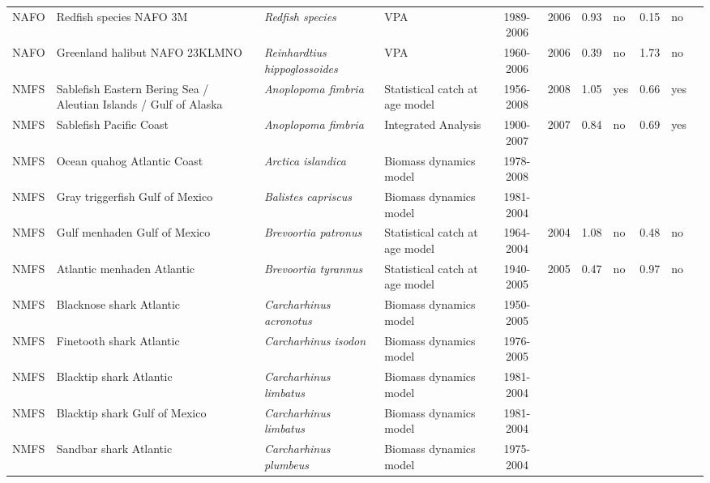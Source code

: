 \begin{longtable}{p{1.8cm}p{3.5cm}p{3.5cm}p{3cm}cccp{0.9cm}cp{0.9cm}c}
  NAFO & Redfish species NAFO 3M & \textit{Redfish species} & VPA & 1989-2006 & 2006 & 0.93 & no & 0.15 & no & \cite{NAFO-RED3M-2007.pdf} \\ 
  NAFO & Greenland halibut NAFO 23KLMNO & \textit{Reinhardtius hippoglossoides} & VPA & 1960-2006 & 2006 & 0.39 & no & 1.73 & no & \cite{NAFO-GHAL23KLMNO-2007.pdf} \\ 
  NMFS & Sablefish Eastern Bering Sea / Aleutian Islands / Gulf of Alaska & \textit{Anoplopoma fimbria} & Statistical catch at age model & 1956-2008 & 2008 & 1.05 & yes & 0.66 & yes & \cite{AFSC-SABLEFEBSAIGA-2008-Sablefish-EBS-AI-GA.pdf} \\ 
  NMFS & Sablefish Pacific Coast & \textit{Anoplopoma fimbria} & Integrated Analysis & 1900-2007 & 2007 & 0.84 & no & 0.69 & yes & \cite{NWFSC-SABLEFPCOAST-2007-Sablefish.pdf} \\ 
  NMFS & Ocean quahog Atlantic Coast & \textit{Arctica islandica} & Biomass dynamics model & 1978-2008 &  &  &  &  &  & \cite{quahog.pdf} \\ 
  NMFS & Gray triggerfish Gulf of Mexico & \textit{Balistes capriscus} & Biomass dynamics model & 1981-2004 &  &  &  &  &  & \cite{JENSEN_GTRIGGM_2006.pdf} \\ 
  NMFS & Gulf menhaden Gulf of Mexico & \textit{Brevoortia patronus} & Statistical catch at age model & 1964-2004 & 2004 & 1.08 & no & 0.48 & no & \cite{GILROY-MENHADENGM-2007.pdf} \\ 
  NMFS & Atlantic menhaden Atlantic & \textit{Brevoortia tyrannus} & Statistical catch at age model & 1940-2005 & 2005 & 0.47 & no & 0.97 & no & \cite{Atl.Menhaden-ASMFC-2006.pdf} \\ 
  NMFS & Blacknose shark Atlantic & \textit{Carcharhinus acronotus} & Biomass dynamics model & 1950-2005 &  &  &  &  &  & \cite{SmallcoastalAtl2007-SEFSC.pdf} \\ 
  NMFS & Finetooth shark Atlantic & \textit{Carcharhinus isodon} & Biomass dynamics model & 1976-2005 &  &  &  &  &  & \cite{SmallcoastalAtl2007-SEFSC.pdf} \\ 
  NMFS & Blacktip shark Atlantic & \textit{Carcharhinus limbatus} & Biomass dynamics model & 1981-2004 &  &  &  &  &  & \cite{LargeCoastalAtl2006-SEFSC.pdf} \\ 
  NMFS & Blacktip shark Gulf of Mexico & \textit{Carcharhinus limbatus} & Biomass dynamics model & 1981-2004 &  &  &  &  &  & \cite{LargeCoastalAtl2006-SEFSC.pdf} \\ 
  NMFS & Sandbar shark Atlantic & \textit{Carcharhinus plumbeus} & Biomass dynamics model & 1975-2004 &  &  &  &  &  & \cite{LargeCoastalAtl2006-SEFSC.pdf} \\ 

\end{longtable}
